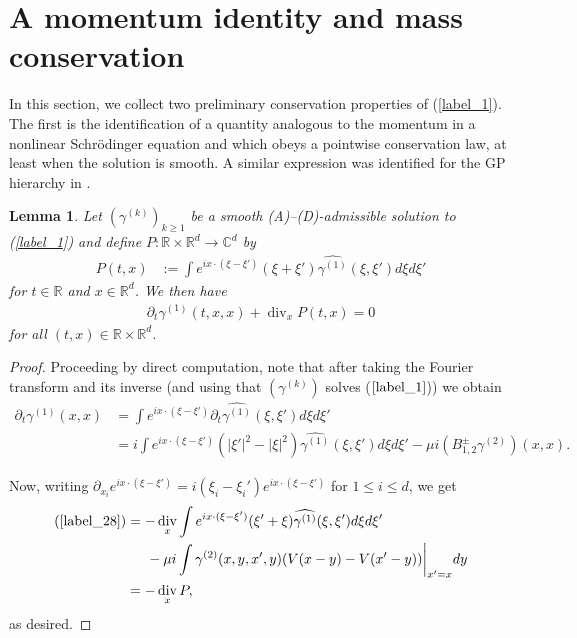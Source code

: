 \documentclass[reqno]{amsart}
\numberwithin{equation}{section}
\newtheorem{lemma}[theorem]{Lemma}
\theoremstyle{remark}
\DeclareMathOperator{\divop}{div}
\begin{document}
\section{A momentum identity and mass conservation}
\label{label_10}

In this section, we collect two preliminary conservation properties of (\ref{label_1}).  The first is the identification of a quantity
analogous to the momentum in a nonlinear Schr\"odinger equation and which obeys a pointwise conservation law, at least when the
solution is smooth.  A similar expression was identified for the GP hierarchy in \cite{CPT}.

\begin{lemma}
\label{label_26}
Let $(\gamma^{(k)})_{k\geq 1}$ be a smooth (A)--(D)-admissible solution to (\ref{label_1}) and define $P:\mathbb{R}\times\mathbb{R}^d\rightarrow\mathbb{C}^d$ by
\begin{align}
P(t,x)&:=\int e^{ix\cdot(\xi-\xi')}(\xi+\xi')\widehat{\gamma^{(1)}}(\xi,\xi')d\xi d\xi'\label{label_27}
\end{align}
for $t\in\mathbb{R}$ and $x\in\mathbb{R}^d$.  We then have
\begin{align*}
\partial_t \gamma^{(1)}(t,x,x)+\divop_x P(t,x)=0
\end{align*}
for all $(t,x)\in\mathbb{R}\times\mathbb{R}^d$.
\end{lemma}

\begin{proof}
Proceeding by direct computation, note that after taking the Fourier transform and its inverse (and using that $(\gamma^{(k)})$ solves ($\ref{label_1}$)) we obtain
\begin{align}
\nonumber \partial_t \gamma^{(1)}(x,x)&=\int e^{ix\cdot (\xi-\xi')}\partial_t \widehat{\gamma^{(1)}}(\xi,\xi')d\xi d\xi'\\
&=i\int e^{ix\cdot (\xi-\xi')}(|\xi'|^2-|\xi|^2)\widehat{\gamma^{(1)}}(\xi,\xi')d\xi d\xi'-\mu i(B^\pm_{1,2}\gamma^{(2)})(x,x).\label{label_28}
\end{align}

Now, writing $\partial_{x_i}e^{ix\cdot(\xi-\xi')}=i(\xi_i-\xi_i')e^{ix\cdot(\xi-\xi')}$ for $1\leq i\leq d$, we get
\begin{align*}
(\ref{label_28})&=-\divop_x\int e^{ix\cdot (\xi-\xi')}(\xi'+\xi)\widehat{\gamma^{(1)}}(\xi,\xi')d\xi d\xi'\\
&\hspace{0.2in}-\mu i\int \gamma^{(2)}(x,y,x',y)(V(x-y)-V(x'-y))\bigg|_{x'=x}dy\\
&=-\divop_x P,
\end{align*}
as desired.
\end{proof}
\end{document}
